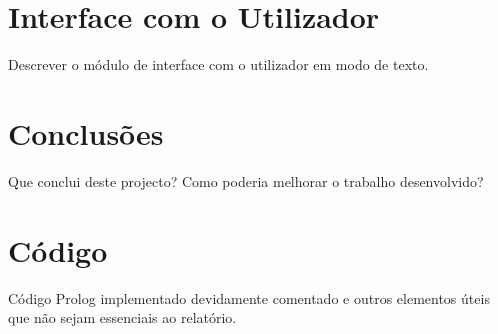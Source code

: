 \documentclass[a4paper]{article}
\begin{document}
\section{Interface com o Utilizador}

Descrever o módulo de interface com o utilizador em modo de texto.


\section{Conclusões}
Que conclui deste projecto? Como poderia melhorar o trabalho desenvolvido?


\clearpage
{}
\renewcommand\refname{Bibliografia}



\newpage
\appendix
\section{Código}
Código Prolog implementado devidamente comentado e outros elementos úteis que não sejam essenciais ao relatório.
\end{document}
